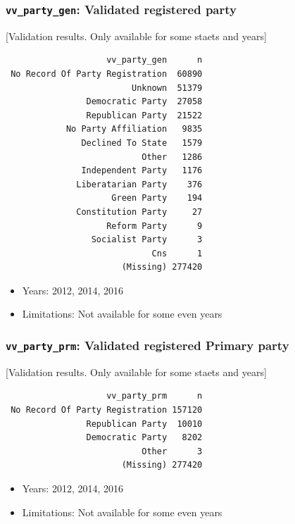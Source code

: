 \documentclass[10pt,article,oneside]{memoir}
\theoremstyle{definition}
\begin{document}
\subsubsection{\texorpdfstring{\texttt{vv\_party\_gen}: Validated
registered
party}{vv\_party\_gen: Validated registered party}}\label{vv_party_gen-validated-registered-party}

{[}Validation results. Only available for some staets and years{]}

\begin{verbatim}
                    vv_party_gen      n
 No Record Of Party Registration  60890
                         Unknown  51379
                Democratic Party  27058
                Republican Party  21522
            No Party Affiliation   9835
               Declined To State   1579
                           Other   1286
               Independent Party   1176
              Liberatarian Party    376
                     Green Party    194
              Constitution Party     27
                    Reform Party      9
                 Socialist Party      3
                             Cns      1
                       (Missing) 277420
\end{verbatim}

\begin{itemize}
\tightlist
\item
  Years: 2012, 2014, 2016
\item
  Limitations: Not available for some even years
\end{itemize}

\subsubsection{\texorpdfstring{\texttt{vv\_party\_prm}: Validated
registered Primary
party}{vv\_party\_prm: Validated registered Primary party}}\label{vv_party_prm-validated-registered-primary-party}

{[}Validation results. Only available for some staets and years{]}

\begin{verbatim}
                    vv_party_prm      n
 No Record Of Party Registration 157120
                Republican Party  10010
                Democratic Party   8202
                           Other      3
                       (Missing) 277420
\end{verbatim}

\begin{itemize}
\tightlist
\item
  Years: 2012, 2014, 2016
\item
  Limitations: Not available for some even years
\end{itemize}
\end{document}
